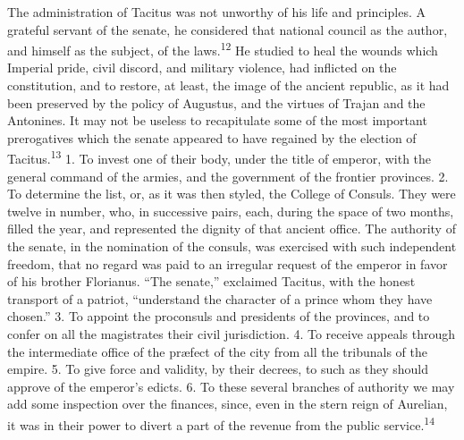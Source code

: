 
The administration of Tacitus was not unworthy of his life and
principles. A grateful servant of the senate, he considered that
national council as the author, and himself as the subject, of
the laws.\textsuperscript{12} He studied to heal the wounds which Imperial pride,
civil discord, and military violence, had inflicted on the
constitution, and to restore, at least, the image of the ancient
republic, as it had been preserved by the policy of Augustus, and
the virtues of Trajan and the Antonines. It may not be useless to
recapitulate some of the most important prerogatives which the
senate appeared to have regained by the election of Tacitus.\textsuperscript{13}
1. To invest one of their body, under the title of emperor, with
the general command of the armies, and the government of the
frontier provinces. 2. To determine the list, or, as it was then
styled, the College of Consuls. They were twelve in number, who,
in successive pairs, each, during the space of two months, filled
the year, and represented the dignity of that ancient office. The
authority of the senate, in the nomination of the consuls, was
exercised with such independent freedom, that no regard was paid
to an irregular request of the emperor in favor of his brother
Florianus. “The senate,” exclaimed Tacitus, with the honest
transport of a patriot, “understand the character of a prince
whom they have chosen.” 3. To appoint the proconsuls and
presidents of the provinces, and to confer on all the magistrates
their civil jurisdiction. 4. To receive appeals through the
intermediate office of the præfect of the city from all the
tribunals of the empire. 5. To give force and validity, by their
decrees, to such as they should approve of the emperor’s edicts.
6. To these several branches of authority we may add some
inspection over the finances, since, even in the stern reign of
Aurelian, it was in their power to divert a part of the revenue
from the public service.\textsuperscript{14}



